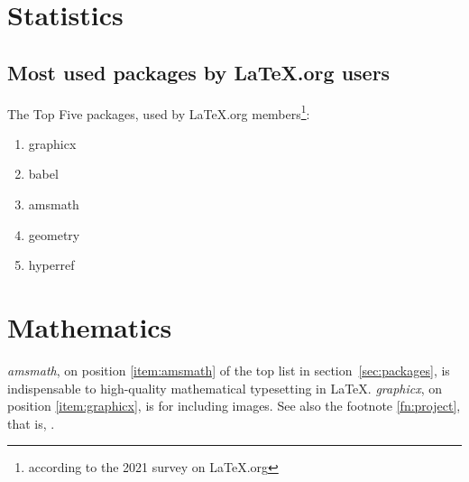 \documentclass{book}
\begin{document}
\chapter{Statistics}
\section{Most used packages by LaTeX.org users}
\label{sec:packages}
The Top Five packages, used by LaTeX.org
members\footnote{according to the 2021 survey on
LaTeX.org\label{fn:project}}:
\begin{enumerate}
  \item graphicx\label{item:graphicx}
  \item babel
  \item amsmath\label{item:amsmath}
  \item geometry
  \item hyperref
\end{enumerate}
\chapter{Mathematics}
\emph{amsmath}, on position \vref{item:amsmath}
of the top list in section~\vref{sec:packages},
is indispensable to high-quality mathematical
typesetting in \LaTeX. \emph{graphicx}, on position
\vref{item:graphicx}, is for including images.
See also the footnote \vref{fn:project}, that is,
.
\end{document}
